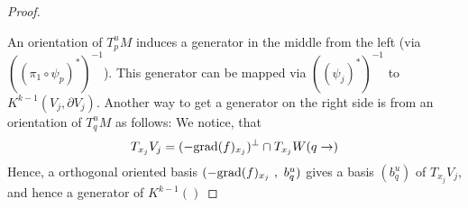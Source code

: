 \begin{proof}
 \begin{center}
 \end{center}
An orientation of $T^u_pM$ induces a generator in the middle from the left (via $((\pi_1\circ \psi_p)^*)^{-1}$). This generator can be mapped via $((\psi_j)^*)^{-1}$ to $K^{k-1}(V_j,\partial V_j)$. Another way to get a generator on the right side is from an orientation of $T^u_qM$ as follows:
We notice, that 
 \begin{align*}
     T_{x_j}V_j=(-\mathrm{grad}(f)_{x_j})^{\perp}\cap T_{x_j}W(q\to)
 \end{align*} Hence, a orthogonal oriented basis $(-\mathrm{grad}(f)_{x_j}~,~b^u_q)$ gives a basis $(b^u_q)$ of $ T_{x_j}V_j$, and hence a generator of $K^{k-1}()$



\end{proof}
